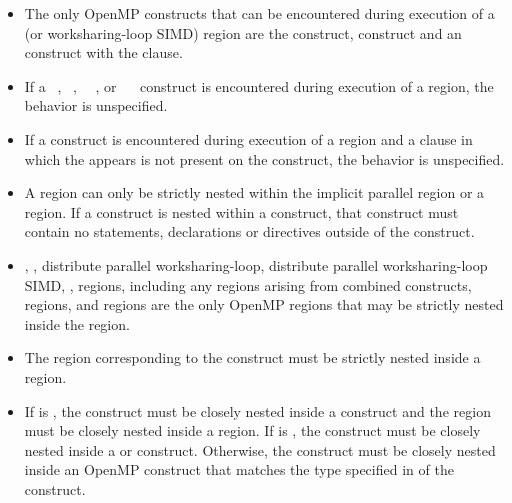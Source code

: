 \begin{itemize}
\item The only OpenMP constructs that can be encountered during execution of a
   (or worksharing-loop SIMD) region are the  construct,
   construct and an  construct with the  clause.

\item If a ~, ~,
~~, or
~~ construct is encountered during
execution of a  region, the behavior is unspecified.

\item If a  construct is encountered during execution of a
 region and a  clause in which the 
 appears is not present on the construct, the behavior is unspecified.

\item A  region can only be strictly nested within the implicit parallel region or a  region.
If a  construct is nested within a  construct,
that  construct must contain no statements, declarations or
directives outside of the  construct.

\item {}, , distribute parallel worksharing-loop,
  distribute parallel worksharing-loop SIMD, ,  regions, including any
 regions arising from combined constructs,  regions, and  regions are the only OpenMP regions
that may be strictly nested inside the  region.

\item The region corresponding to the  construct must be
strictly nested inside a  region.

\item If  is , the 
construct must be closely nested inside a  construct and the
 region must be closely nested inside a  region. If
 is , the  construct
must be closely nested inside a  or  construct.
Otherwise, the  construct must be closely
nested inside an OpenMP construct that matches the type specified in
 of the  construct.


\end{itemize}
